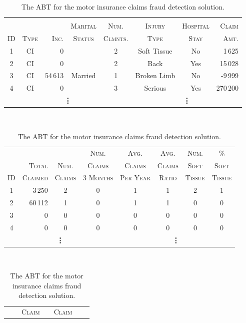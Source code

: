 \documentclass[xcolor={table}]{beamer}
\newcommand{\featN}[1]{\textsc{#1}}
\begin{document}
 \begin{frame} [plain]
\begin{table}[!tb]
\caption{The ABT for the motor insurance claims fraud detection solution.}
\label{table:fraudDetectionABT}
\begin{tiny}
\begin{tabular}{ c c r c c c c r}
\hline
	&		&		&		&		&		&		&		\\
	&		&		&	\featN{Marital}	&	\featN{Num.}	&	\featN{Injury}	&	\featN{Hospital}	&	\featN{Claim}	\\
\featN{ID}	&	\featN{Type}	&	\featN{Inc}.	&	\featN{Status}	&	\featN{Clmnts.}	&	\featN{Type}	&	\featN{Stay}	&	\featN{Amt.}	\\
	\hline
1	&	CI	&	0	&		&	2	&	Soft Tissue	&	No	&	1\,625	\\
2	&	CI	&	0	&		&	2	&	Back	&	Yes	&	15\,028	\\
3	&	CI	&	54\,613	&	Married	&	1	&	Broken Limb	&	No	&	-9\,999	\\
4	&	CI	&	0	&		&	3	&	Serious	&	Yes	&	270\,200	\\	
\multicolumn{5}{c}{\textbf{\vdots}} & \multicolumn{3}{c}{\textbf{\vdots}}\\
\hline
\end{tabular}
\vspace{0.2in}\\
\begin{tabular}{ c r c c c c c c}
\hline
	&		&		&	\featN{Num.}	&	\featN{Avg.}	&	\featN{Avg.}	&	\featN{Num.}	&	\featN{\%}	\\
	&	\featN{Total}	&	\featN{Num.}	&	\featN{Claims} &	\featN{Claims}	&	\featN{Claims}	&	\featN{Soft}	&	\featN{Soft}	\\
\featN{ID}	&	\featN{Claimed}	&	\featN{Claims}	&	\featN{3 Months} &	\featN{Per Year}	&	\featN{Ratio}	&	\featN{Tissue}	&	\featN{Tissue}	\\
	\hline
1	&	3\,250	&	2	&	0	&	1	&	1	&	2	&	1	\\
2	&	60\,112	&	1	&	0	&	1	&	1	&	0	&	0	\\
3	&	0	&	0	&	0	&	0	&	0	&	0	&	0	\\
4	&	0	&	0	&	0	&	0	&	0	&	0	&	0	\\
\multicolumn{4}{c}{\textbf{\vdots}} & \multicolumn{4}{c}{\textbf{\vdots}}\\
	\hline
\end{tabular}
\vspace{0.2in}\\
\begin{tabular}{ c c r c c c c }
\hline
	&		&	\featN{Claim} &		&	\featN{Claim}	&		&		\\

\end{tabular}
\end{tiny}
\end{table}
\end{frame}
\end{document}
